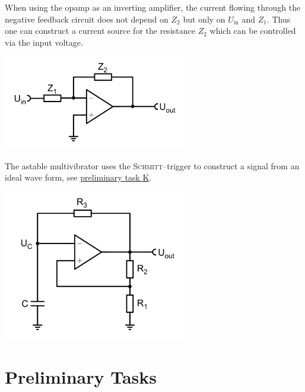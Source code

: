 \documentclass[a4paper,10pt]{article}
\newenvironment{Figure}
        {\par\medskip\noindent\minipage{\linewidth}}
        {\endminipage\par\medskip}
\numberwithin{equation}{section}
\begin{document}
\begin{multicols}{2}
\begin{Figure}
        \end{Figure}
        \noindent When using the opamp as an inverting amplifier, the current flowing through the negative feedback circuit does not depend on $Z_2$ but only on $U_\text{in}$ and $Z_1$.
        Thus one can construct a current source for the resistance $Z_2$ which can be controlled via the input voltage.
        \begin{Figure}
                \centering
                \includegraphics[width=0.6\textwidth]{inverting_amp.png}
        \end{Figure}
        \noindent The astable multivibrator uses the \textsc{Schmitt}--trigger to construct a signal from an ideal wave form, see \hyperref[pre:K]{preliminary task K}.
        \begin{Figure}
                \centering
                \includegraphics[width=0.6\textwidth]{astable_multivibrator.png}
        \end{Figure}

        \section{Preliminary Tasks}

\end{multicols}
\end{document}
